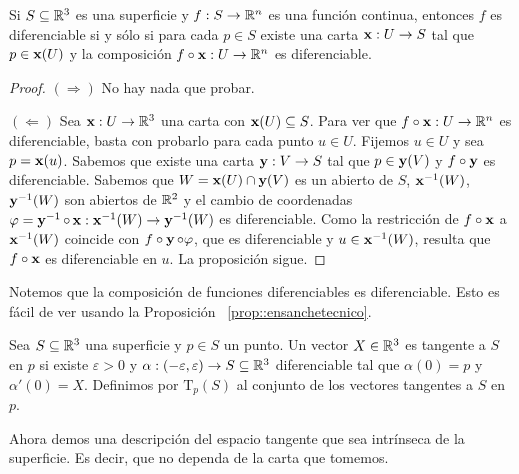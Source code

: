 \begin{prop}\label{prop::diferenciabilidadcartas}
Si $S\subseteq\mathbb{R}^3$ es una superficie y $f:S\to\mathbb{R}^n$ es una función continua, entonces $f$ es diferenciable si y sólo si para cada $p\in S$ existe una carta $\operatorname{\mathbf{x}}:U\to S$ tal que $p\in\operatorname{\mathbf{x}}(U)$ y la composición $f\circ\operatorname{\mathbf{x}}:U\to\mathbb{R}^n$ es diferenciable.
\begin{proof}
\hfill

$(\Longrightarrow)$ No hay nada que probar.

$(\Longleftarrow)$ Sea $\operatorname{\mathbf{x}}:U\to\mathbb{R}^3$ una carta con $\operatorname{\mathbf{x}}(U)\subseteq S$. Para ver que $f\circ\operatorname{\mathbf{x}}:U\to\mathbb{R}^n$ es diferenciable, basta con probarlo para cada punto $u\in U$. Fijemos $u\in U$ y sea $p=\operatorname{\mathbf{x}}(u)$. Sabemos que existe una carta $\operatorname{\mathbf{y}}:V\to S$ tal que $p\in\operatorname{\mathbf{y}}(V)$ y $f\circ\operatorname{\mathbf{y}}$ es diferenciable. Sabemos que $W=\operatorname{\mathbf{x}}(U)\cap\operatorname{\mathbf{y}}(V)$ es un abierto de $S$, $\operatorname{\mathbf{x}}^{-1}(W)$, $\operatorname{\mathbf{y}}^{-1}(W)$ son abiertos de $\mathbb{R}^2$ y el cambio de coordenadas $\varphi = \operatorname{\mathbf{y}}^{-1}\circ\operatorname{\mathbf{x}} : \operatorname{\mathbf{x}}^{-1}(W)\to\operatorname{\mathbf{y}}^{-1}(W)$ es diferenciable. Como la restricción de $f\circ\operatorname{\mathbf{x}}$ a $\operatorname{\mathbf{x}}^{-1}(W)$ coincide con $f\circ\operatorname{\mathbf{y}}\circ\varphi$, que es diferenciable y $u\in\operatorname{\mathbf{x}}^{-1}(W)$, resulta que $f\circ\operatorname{\mathbf{x}}$ es diferenciable en $u$. La proposición sigue.
\end{proof}
\end{prop}

\begin{obs}
Notemos que la composición de funciones diferenciables es diferenciable. Esto es fácil de ver usando la Proposición ~\ref{prop::ensanchetecnico}.
\end{obs}

\begin{defn}
Sea $S\subseteq\mathbb{R}^3$ una superficie y $p\in S$ un punto. Un vector $X\in\mathbb{R}^3$ es tangente a $S$ en $p$ si existe $\varepsilon>0$ y $\alpha:(-\varepsilon,\varepsilon)\to S\subseteq\mathbb{R}^3$ diferenciable tal que $\alpha(0)=p$ y $\alpha'(0)=X$. Definimos por $\mathrm{T}_p(S)$ al conjunto de los vectores tangentes a $S$ en $p$.
\end{defn}

Ahora demos una descripción del espacio tangente que sea intrínseca de la superficie. Es decir, que no dependa de la carta que tomemos.


